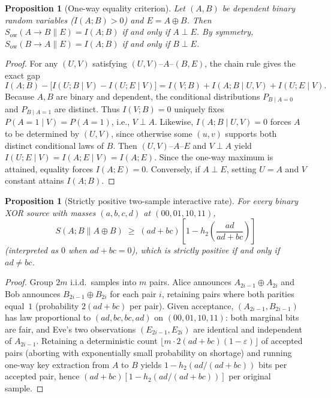 \documentclass[11pt]{article}
\theoremstyle{plain}
\newtheorem{proposition}[theorem]{Proposition}
\theoremstyle{definition}
\theoremstyle{remark}
\newcommand{\Sow}{S_{\mathrm{ow}}}
\newcommand{\mkv}{\text{--}}
\begin{document}
\begin{proposition}[One-way equality criterion]\label{prop:ow}
Let $(A, B)$ be dependent binary random variables ($I(A; B) > 0$) and $E = A \oplus B$.
Then $\Sow(A \to B \| E) = I(A; B)$ if and only if $A \perp E$.
By symmetry, $\Sow(B \to A \| E) = I(A; B)$ if and only if $B \perp E$.
\end{proposition}

\begin{proof}
For any $(U, V)$ satisfying $(U, V) \mkv A \mkv (B, E)$, the chain rule gives the exact gap
\[
I(A; B) - \bigl[I(U; B \mid V) - I(U; E \mid V)\bigr] = I(V; B) + I(A; B \mid U, V) + I(U; E \mid V).
\]
Because $A, B$ are binary and dependent, the conditional distributions $P_{B \mid A = 0}$ and $P_{B \mid A = 1}$ are distinct.
Thus $I(V; B) = 0$ uniquely fixes $P(A = 1 \mid V) = P(A = 1)$, i.e., $V \perp A$.
Likewise, $I(A; B \mid U, V) = 0$ forces $A$ to be determined by $(U, V)$, since otherwise some $(u, v)$ supports both distinct conditional laws of $B$.
Then $(U, V) \mkv A \mkv E$ and $V \perp A$ yield $I(U; E \mid V) = I(A; E \mid V) = I(A; E)$.
Since the one-way maximum is attained, equality forces $I(A; E) = 0$.
Conversely, if $A \perp E$, setting $U = A$ and $V$ constant attains $I(A; B)$.
\end{proof}

\begin{proposition}[Strictly positive two-sample interactive rate]\label{prop:twosample}
For every binary XOR source with masses $(a, b, c, d)$ at $(00, 01, 10, 11)$,
\[
S(A; B \| A \oplus B) \;\ge\; (ad + bc)\left[1 - h_2\!\left(\frac{ad}{ad + bc}\right)\right]
\]
(interpreted as $0$ when $ad + bc = 0$), which is strictly positive if and only if $ad \neq bc$.
\end{proposition}

\begin{proof}
Group $2m$ i.i.d.\ samples into $m$ pairs.
Alice announces $A_{2i-1} \oplus A_{2i}$ and Bob announces $B_{2i-1} \oplus B_{2i}$ for each pair $i$, retaining pairs where both parities equal~$1$ (probability $2(ad + bc)$ per pair).
Given acceptance, $(A_{2i-1}, B_{2i-1})$ has law proportional to $(ad, bc, bc, ad)$ on $(00, 01, 10, 11)$: both marginal bits are fair, and Eve's two observations $(E_{2i-1}, E_{2i})$ are identical and independent of $A_{2i-1}$.
Retaining a deterministic count $\lfloor m \cdot 2(ad + bc)(1 - \varepsilon)\rfloor$ of accepted pairs (aborting with exponentially small probability on shortage) and running one-way key extraction from $A$ to $B$ yields $1 - h_2(ad/(ad + bc))$ bits per accepted pair, hence $(ad + bc)[1 - h_2(ad/(ad + bc))]$ per original sample.
\end{proof}
\end{document}

